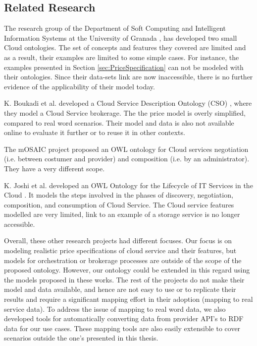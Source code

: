 \subsection{Related Research}
The research group of the Department of Soft Computing and Intelligent Information Systems
at the University of Granada \cite{DataMiningServicedefinitionInCloud}, 
has developed two small Cloud ontologies.
The set of concepts and features they covered are limited and as a result, their examples are limited to some simple cases.
For instance, the examples presented in Section \ref{sec:PriceSpecification}
can not be modeled with their ontologies.
Since their data-sets link are now inaccessible,
there is no further evidence of the applicability of their model today.

K. Boukadi et al. developed a Cloud Service Description Ontology (CSO) \cite{Boukadi2016CloudSD}, where they model a Cloud Service brokerage. The the price model is overly simplified, compared to real word scenarios. Their model and data is also not available online to evaluate it further or to reuse it in other contexts.

The mOSAIC project \cite{Moscato2011AnAO} proposed an OWL ontology for Cloud services negotiation (i.e. between costumer and provider) and composition (i.e. by an administrator). They have a very different scope.

K. Joshi et al. developed an OWL Ontology for the Lifecycle of IT Services in the
Cloud \cite{Joshi2014AutomatingCS}. It models the steps involved in the
phases of discovery, negotiation, composition, and consumption of Cloud Service.
The Cloud service features modelled are very limited, link to an example of a
storage service \cite{kjoshi_storage_ontology} is no longer accessible.

Overall, these other research projects had different focuses. 
Our focus is on modeling realistic price specifications of cloud service and their  features, 
but models for orchestration \cite{Moscato2011AnAO,Joshi2014AutomatingCS} or
brokerage processes \cite{Boukadi2016CloudSD} are outside of the scope of the proposed ontology. However, our ontology could be extended in this regard using the models proposed in these works.
The rest of the projects \cite{Boukadi2016CloudSD,Moscato2011AnAO}
do not make their model and data available, and hence are not easy to use or to replicate their results and require a significant mapping effort in their adoption (mapping to real service data).
To address the issue of mapping to real word data, we also developed tools for automatically converting data from provider API's to RDF data for our use cases. These mapping tools are also easily extensible to cover scenarios outside the one's presented in this thesis.

